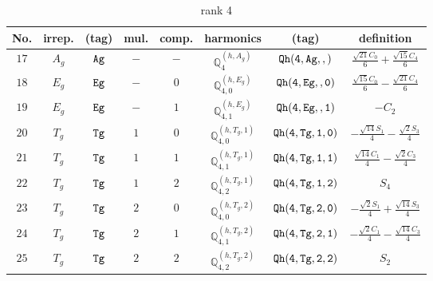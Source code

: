 \documentclass[fleqn,8pt]{jsarticle}
\begin{document}
\begin{table}[ht!]
\begin{center}
\caption{rank 4}
\renewcommand{\arraystretch}{1.3}
\begin{tabular}{cccccccc} \hline \hline
No. & irrep. & (tag) & mul. & comp. & harmonics & (tag) & definition \\ \hline
$ 17 $ & $ A_{g} $ & $ {\tt Ag} $ & $ - $ & $ - $ & $ \mathbb{Q}_{4}^{(h,A_{g})} $ & $ {\tt Qh(4,Ag,,)} $ & $ \frac{\sqrt{21} C_{0}}{6} + \frac{\sqrt{15} C_{4}}{6} $ \\
$ 18 $ & $ E_{g} $ & $ {\tt Eg} $ & $ - $ & $ 0 $ & $ \mathbb{Q}_{4,0}^{(h,E_{g})} $ & $ {\tt Qh(4,Eg,,0)} $ & $ \frac{\sqrt{15} C_{0}}{6} - \frac{\sqrt{21} C_{4}}{6} $ \\
$ 19 $ & $ E_{g} $ & $ {\tt Eg} $ & $ - $ & $ 1 $ & $ \mathbb{Q}_{4,1}^{(h,E_{g})} $ & $ {\tt Qh(4,Eg,,1)} $ & $ - C_{2} $ \\
$ 20 $ & $ T_{g} $ & $ {\tt Tg} $ & $ 1 $ & $ 0 $ & $ \mathbb{Q}_{4,0}^{(h,T_{g},1)} $ & $ {\tt Qh(4,Tg,1,0)} $ & $ - \frac{\sqrt{14} S_{1}}{4} - \frac{\sqrt{2} S_{3}}{4} $ \\
$ 21 $ & $ T_{g} $ & $ {\tt Tg} $ & $ 1 $ & $ 1 $ & $ \mathbb{Q}_{4,1}^{(h,T_{g},1)} $ & $ {\tt Qh(4,Tg,1,1)} $ & $ \frac{\sqrt{14} C_{1}}{4} - \frac{\sqrt{2} C_{3}}{4} $ \\
$ 22 $ & $ T_{g} $ & $ {\tt Tg} $ & $ 1 $ & $ 2 $ & $ \mathbb{Q}_{4,2}^{(h,T_{g},1)} $ & $ {\tt Qh(4,Tg,1,2)} $ & $ S_{4} $ \\
$ 23 $ & $ T_{g} $ & $ {\tt Tg} $ & $ 2 $ & $ 0 $ & $ \mathbb{Q}_{4,0}^{(h,T_{g},2)} $ & $ {\tt Qh(4,Tg,2,0)} $ & $ - \frac{\sqrt{2} S_{1}}{4} + \frac{\sqrt{14} S_{3}}{4} $ \\
$ 24 $ & $ T_{g} $ & $ {\tt Tg} $ & $ 2 $ & $ 1 $ & $ \mathbb{Q}_{4,1}^{(h,T_{g},2)} $ & $ {\tt Qh(4,Tg,2,1)} $ & $ - \frac{\sqrt{2} C_{1}}{4} - \frac{\sqrt{14} C_{3}}{4} $ \\
$ 25 $ & $ T_{g} $ & $ {\tt Tg} $ & $ 2 $ & $ 2 $ & $ \mathbb{Q}_{4,2}^{(h,T_{g},2)} $ & $ {\tt Qh(4,Tg,2,2)} $ & $ S_{2} $ \\
 \hline \hline
\end{tabular}
\end{center}
\end{table}
\end{document}
